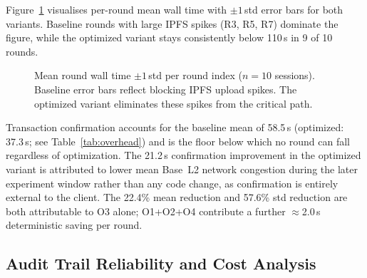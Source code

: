 \documentclass{llncs}
\begin{document}
Figure~\ref{fig:walltime} visualises per-round mean wall time with
$\pm1$\,std error bars for both variants. Baseline rounds with large
IPFS spikes (R3, R5, R7) dominate the figure, while the optimized
variant stays consistently below 110\,s in 9 of 10 rounds.

\begin{figure}[htbp]
\centering
{}
\caption{Mean round wall time $\pm1$\,std per round index ($n=10$
  sessions). Baseline error bars reflect blocking IPFS upload spikes.
  The optimized variant eliminates these spikes from the critical path.}
\label{fig:walltime}
\end{figure}

Transaction confirmation accounts for the baseline mean of 58.5\,s
(optimized: 37.3\,s; see Table~\ref{tab:overhead}) and is the floor below which no round can fall
regardless of optimization. The 21.2\,s confirmation improvement in the
optimized variant is attributed to lower mean Base~L2 network congestion
during the later experiment window rather than any code change, as
confirmation is entirely external to the client. The 22.4\% mean reduction
and 57.6\% std reduction are both attributable to O3 alone; O1+O2+O4
contribute a further $\approx$2.0\,s deterministic saving per round.

\subsection{Audit Trail Reliability and Cost Analysis}
\label{subsec:cost}
\end{document}
